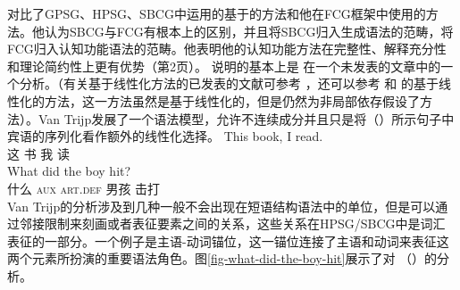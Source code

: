  对比了GPSG、HPSG、SBCG中运用的基于\slaschc 的方法和他在FCG框架中使用的方法。他认为SBCG与FCG有根本上的区别，并且将SBCG归入生成语法的范畴，将FCG归入认知功能语法的范畴。他表明他的认知功能方法在完整性、解释充分性和理论简约性上更有优势（第2页）。 \citet{vanTrijp2014a}说明的基本上是 \citet{Reape2000a}在一个未发表的文章中的一个分析。（有关基于线性化方法的已发表的文献可参考 ，还可以参考 \citet{Kathol2000a}和 的基于线性化的方法，这一方法虽然是基于线性化的，但是仍然为非局部依存假设了\slaschc 方法）。Van Trijp发展了一个语法模型，允许不连续成分并且只是将（）所示句子中宾语的序列化看作额外的线性化选择。
\eal
\ex 
\gll This book, I read.\\  
    这 书 我 读\\
\ex 
\gll What did the boy hit?\\  
    什么 \textsc{aux} \textsc{art}.\textsc{def} 男孩 击打\\
\zl
Van Trijp的分析涉及到几种一般不会出现在短语结构语法中的单位，但是可以通过邻接限制来刻画或者表征要素之间的关系，这些关系在HPSG/SBCG中是词汇表征的一部分。一个例子是主语-动词锚位，这一锚位连接了主语和动词来表征这两个元素所扮演的重要语法角色。图\vref{fig-what-did-the-boy-hit}展示了对 （）的分析。
